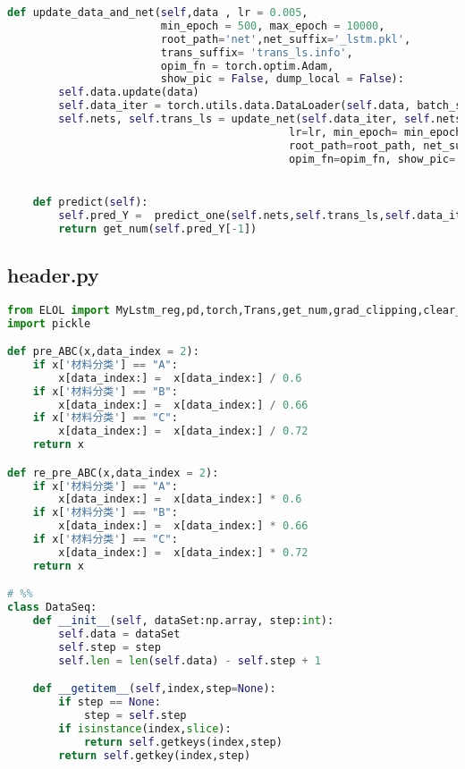 \begin{appendices}
\begin{lstlisting}[language=python]
    def update_data_and_net(self,data , lr = 0.005,
                        min_epoch = 500, max_epoch = 10000,
                        root_path='net',net_suffix='_lstm.pkl',
                        trans_suffix= 'trans_ls.info',
                        opim_fn = torch.optim.Adam,
                        show_pic = False, dump_local = False):
        self.data.update(data)
        self.data_iter = torch.utils.data.DataLoader(self.data, batch_size = 1)
        self.nets, self.trans_ls = update_net(self.data_iter, self.nets, self.imf_num+1, self.device,
                                            lr=lr, min_epoch= min_epoch, max_epoch=max_epoch,
                                            root_path=root_path, net_suffix=net_suffix, trans_suffix= trans_suffix,
                                            opim_fn=opim_fn, show_pic= show_pic, dump_local=dump_local,length=self.length, hidden=self.hidden)


    def predict(self):
        self.pred_Y =  predict_one(self.nets,self.trans_ls,self.data_iter)
        return get_num(self.pred_Y[-1])


\end{lstlisting}

\subsection{header.py}

\begin{lstlisting}[language=python]
from ELOL import MyLstm_reg,pd,torch,Trans,get_num,grad_clipping,clear_output,plt,np
import pickle

def pre_ABC(x,data_index = 2):
    if x['材料分类'] == "A":
        x[data_index:] =  x[data_index:] / 0.6
    if x['材料分类'] == "B":
        x[data_index:] =  x[data_index:] / 0.66
    if x['材料分类'] == "C":
        x[data_index:] =  x[data_index:] / 0.72
    return x

def re_pre_ABC(x,data_index = 2):
    if x['材料分类'] == "A":
        x[data_index:] =  x[data_index:] * 0.6
    if x['材料分类'] == "B":
        x[data_index:] =  x[data_index:] * 0.66
    if x['材料分类'] == "C":
        x[data_index:] =  x[data_index:] * 0.72
    return x

# %%
class DataSeq:
    def __init__(self, dataSet:np.array, step:int):
        self.data = dataSet
        self.step = step
        self.len = len(self.data) - self.step + 1

    def __getitem__(self,index,step=None):
        if step == None:
            step = self.step
        if isinstance(index,slice):
            return self.getkeys(index,step)
        return self.getkey(index,step)


\end{lstlisting}
\end{appendices}
